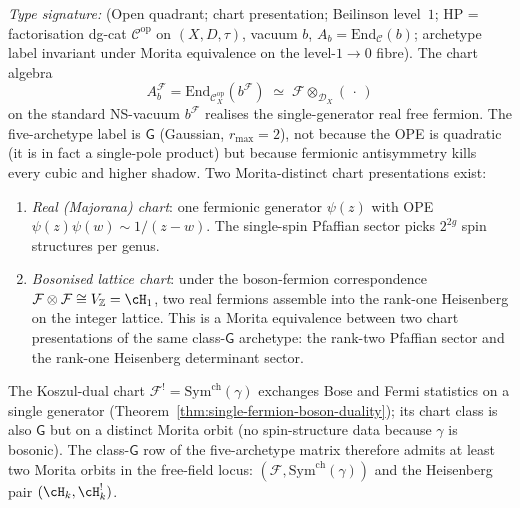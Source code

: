 \begin{remark}
\label{rem:fermion-chart-class-enumeration}
\emph{Type signature:} (Open quadrant; chart presentation;
Beilinson level~$1$; HP = factorisation dg-cat
$\mathcal{C}^{\mathrm{op}}$ on $(X, D, \tau)$, vacuum $b$,
$A_b = \mathrm{End}_\mathcal{C}(b)$; archetype label invariant
under Morita equivalence on the level-$1\to 0$ fibre).
The chart algebra
\[
A_b^{\mathcal F} =
\mathrm{End}_{\mathcal{C}^{\mathrm{op}}_X}(b^{\mathcal F})
\;\simeq\; \mathcal F\otimes_{\mathcal{D}_X}(\,\cdot\,)
\]
on the standard NS-vacuum $b^{\mathcal F}$ realises the
single-generator real free fermion. The five-archetype label is
$\mathsf{G}$ (Gaussian, $r_{\max}=2$), not because the OPE is
quadratic (it is in fact a single-pole product) but because
fermionic antisymmetry kills every cubic and higher shadow.
Two Morita-distinct chart presentations exist:
\begin{enumerate}[label=\textup{(G\arabic*)}]
\item \emph{Real (Majorana) chart}: one fermionic generator
$\psi(z)$ with OPE $\psi(z)\psi(w)\sim 1/(z{-}w)$. The single-spin
Pfaffian sector picks $2^{2g}$ spin structures per genus.
\item \emph{Bosonised lattice chart}: under the boson-fermion
correspondence $\mathcal F\otimes\mathcal F \cong
V_{\mathbb Z}=\cH_1$, two real fermions assemble into the
rank-one Heisenberg on the integer lattice. This is a Morita
equivalence between two chart presentations of the same
class-$\mathsf{G}$ archetype: the rank-two Pfaffian sector and the
rank-one Heisenberg determinant sector.
\end{enumerate}
The Koszul-dual chart $\mathcal F^! = \mathrm{Sym}^{\mathrm{ch}}(\gamma)$
exchanges Bose and Fermi statistics on a single generator
(Theorem~\ref{thm:single-fermion-boson-duality}); its chart class is
also $\mathsf{G}$ but on a distinct Morita orbit (no spin-structure
data because $\gamma$ is bosonic). The class-$\mathsf{G}$ row of
the five-archetype matrix therefore admits at least two Morita
orbits in the free-field locus: $(\mathcal F, \mathrm{Sym}^{\mathrm{ch}}(\gamma))$
and the Heisenberg pair $(\cH_k, \cH_k^!)$.
\end{remark}

